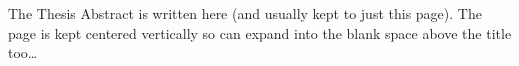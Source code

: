 \documentclass[11pt, numbers=noenddot, titlepage, a4paper, twoside, onecolumn, DIV=calc]{scrbook} %
\begin{document}
\clearpage
\setcounter{page}{1}


\pagestyle{plain}


\clearpage







\pagestyle{plain} 




The Thesis Abstract is written here (and usually kept to just this page). The page is kept centered vertically so can expand into the blank space above the title too\ldots

\clearpage %



\pagestyle{plain} %





%
%


\begin{multicols}{2}[\chapter*{\nomname}] 
 \begin{flushleft}
  \printnomenclature[1.0 in]
 \end{flushleft}  
\end{multicols} 
\end{document}
